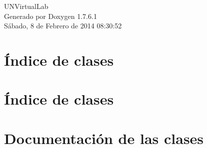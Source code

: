 \documentclass[a4paper]{book}
\begin{document}
\hypersetup{pageanchor=false,citecolor=blue}
\begin{titlepage}
\vspace*{7cm}
\begin{center}
{\Large \-U\-N\-Virtual\-Lab }\\
\vspace*{1cm}
{\large \-Generado por Doxygen 1.7.6.1}\\
\vspace*{0.5cm}
{\small Sábado, 8 de Febrero de 2014 08:30:52}\\
\end{center}
\end{titlepage}
\clearemptydoublepage
{}
\tableofcontents
\clearemptydoublepage
{}
\hypersetup{pageanchor=true,citecolor=blue}
\chapter{Índice de clases}

\chapter{Índice de clases}

\chapter{\-Documentación de las clases}





































\printindex
\end{document}
